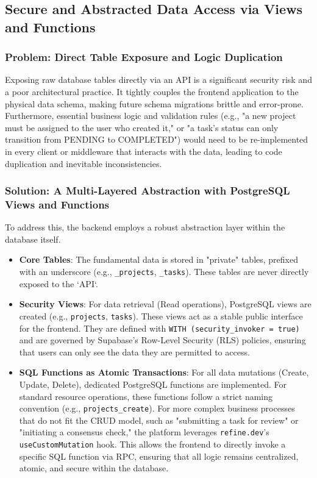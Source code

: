 \subsection{Secure and Abstracted Data Access via Views and Functions}
\label{subsec:secure_data_access}

\subsubsection{Problem: Direct Table Exposure and Logic Duplication}
Exposing raw database tables directly via an API is a significant security risk and a poor architectural practice. It tightly couples the frontend application to the physical data schema, making future schema migrations brittle and error-prone. Furthermore, essential business logic and validation rules (e.g., "a new project must be assigned to the user who created it," or "a task's status can only transition from PENDING to COMPLETED") would need to be re-implemented in every client or middleware that interacts with the data, leading to code duplication and inevitable inconsistencies.

\subsubsection{Solution: A Multi-Layered Abstraction with PostgreSQL Views and Functions}
To address this, the backend employs a robust abstraction layer within the database itself.
\begin{itemize}
    \item \textbf{Core Tables}: The fundamental data is stored in "private" tables, prefixed with an underscore (e.g., \texttt{\_projects}, \texttt{\_tasks}). These tables are never directly exposed to the `API`.
    \item \textbf{Security Views}: For data retrieval (Read operations), PostgreSQL views are created (e.g., \texttt{projects}, \texttt{tasks}). These views act as a stable public interface for the frontend. They are defined with \texttt{WITH (security\_invoker = true)} and are governed by Supabase's Row-Level Security (RLS) policies, ensuring that users can only see the data they are permitted to access.
    \item \textbf{SQL Functions as Atomic Transactions}: For all data mutations (Create, Update, Delete), dedicated PostgreSQL functions are implemented. For standard resource operations, these functions follow a strict naming convention (e.g., \texttt{projects\_create}). For more complex business processes that do not fit the CRUD model, such as "submitting a task for review" or "initiating a consensus check," the platform leverages \texttt{refine.dev}'s \texttt{useCustomMutation} hook. This allows the frontend to directly invoke a specific SQL function via RPC, ensuring that all logic remains centralized, atomic, and secure within the database.
\end{itemize}

